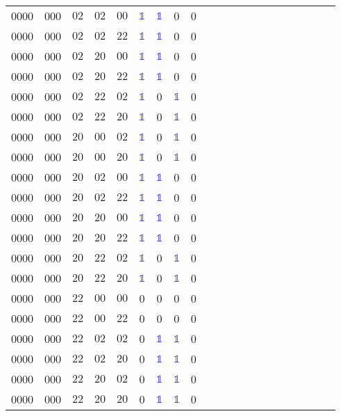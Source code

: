 \begin{longtable*}{c| cccccccccccccccccccc }
0000& 000& $02$& $02$& $00$& \textcolor{blue}{$\mathds{1}$}& \textcolor{blue}{$\mathds{1}$}& 0& 0\\
0000& 000& $02$& $02$& $22$& \textcolor{blue}{$\mathds{1}$}& \textcolor{blue}{$\mathds{1}$}& 0& 0\\
0000& 000& $02$& $20$& $00$& \textcolor{blue}{$\mathds{1}$}& \textcolor{blue}{$\mathds{1}$}& 0& 0\\
0000& 000& $02$& $20$& $22$& \textcolor{blue}{$\mathds{1}$}& \textcolor{blue}{$\mathds{1}$}& 0& 0\\
0000& 000& $02$& $22$& $02$& \textcolor{blue}{$\mathds{1}$}& 0& \textcolor{blue}{$\mathds{1}$}& 0\\
0000& 000& $02$& $22$& $20$& \textcolor{blue}{$\mathds{1}$}& 0& \textcolor{blue}{$\mathds{1}$}& 0\\
0000& 000& $20$& $00$& $02$& \textcolor{blue}{$\mathds{1}$}& 0& \textcolor{blue}{$\mathds{1}$}& 0\\
0000& 000& $20$& $00$& $20$& \textcolor{blue}{$\mathds{1}$}& 0& \textcolor{blue}{$\mathds{1}$}& 0\\
0000& 000& $20$& $02$& $00$& \textcolor{blue}{$\mathds{1}$}& \textcolor{blue}{$\mathds{1}$}& 0& 0\\
0000& 000& $20$& $02$& $22$& \textcolor{blue}{$\mathds{1}$}& \textcolor{blue}{$\mathds{1}$}& 0& 0\\
0000& 000& $20$& $20$& $00$& \textcolor{blue}{$\mathds{1}$}& \textcolor{blue}{$\mathds{1}$}& 0& 0\\
0000& 000& $20$& $20$& $22$& \textcolor{blue}{$\mathds{1}$}& \textcolor{blue}{$\mathds{1}$}& 0& 0\\
0000& 000& $20$& $22$& $02$& \textcolor{blue}{$\mathds{1}$}& 0& \textcolor{blue}{$\mathds{1}$}& 0\\
0000& 000& $20$& $22$& $20$& \textcolor{blue}{$\mathds{1}$}& 0& \textcolor{blue}{$\mathds{1}$}& 0\\
0000& 000& $22$& $00$& $00$& 0& 0& 0& 0\\
0000& 000& $22$& $00$& $22$& 0& 0& 0& 0\\
0000& 000& $22$& $02$& $02$& 0& \textcolor{blue}{$\mathds{1}$}& \textcolor{blue}{$\mathds{1}$}& 0\\
0000& 000& $22$& $02$& $20$& 0& \textcolor{blue}{$\mathds{1}$}& \textcolor{blue}{$\mathds{1}$}& 0\\
0000& 000& $22$& $20$& $02$& 0& \textcolor{blue}{$\mathds{1}$}& \textcolor{blue}{$\mathds{1}$}& 0\\
0000& 000& $22$& $20$& $20$& 0& \textcolor{blue}{$\mathds{1}$}& \textcolor{blue}{$\mathds{1}$}& 0\\

\end{longtable*}
